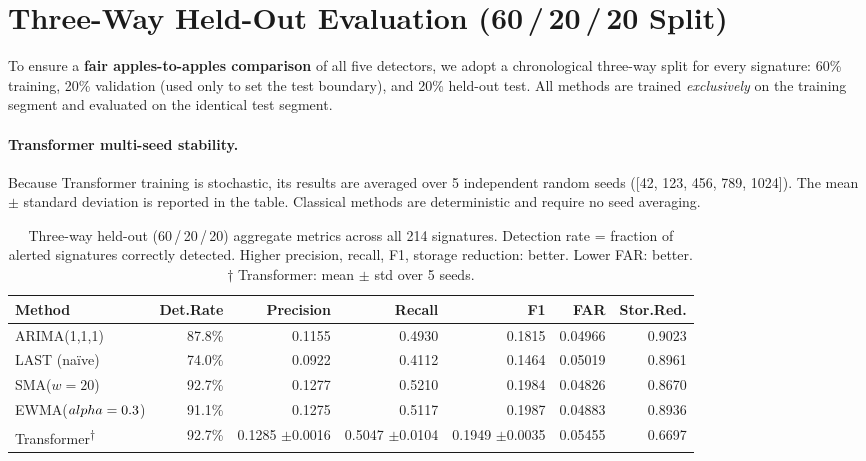 \documentclass[11pt,a4paper]{article}
\begin{document}
\section{Three-Way Held-Out Evaluation (60\,/\,20\,/\,20 Split)}

To ensure a \textbf{fair apples-to-apples comparison} of all five
detectors, we adopt a chronological three-way split for every signature:
60\% training, 20\% validation (used only to set the test boundary),
and 20\% held-out test.  All methods are trained \emph{exclusively} on the
training segment and evaluated on the identical test segment.

\paragraph{Transformer multi-seed stability.}
Because Transformer training is stochastic, its results are averaged over
5 independent random seeds ([42, 123, 456, 789, 1024]).
The mean $\pm$ standard deviation is reported in the table.
Classical methods are deterministic and require no seed averaging.

\begin{table}[H]
\centering
\caption{Three-way held-out (60\,/\,20\,/\,20) aggregate metrics across
  all 214 signatures.  Detection rate = fraction of alerted signatures
  correctly detected.  Higher precision, recall, F1, storage reduction:
  better.  Lower FAR: better.
  $\dagger$ Transformer: mean $\pm$ std over 5 seeds.}
\label{tab:threeway}
\begin{tabular}{lrrrrrr}
\toprule
Method & Det.Rate & Precision & Recall & F1 & FAR & Stor.Red. \\
\midrule
  ARIMA(1,1,1) & 87.8\% & 0.1155 & 0.4930 & 0.1815 & 0.04966 & 0.9023 \\
  LAST (na\"ive) & 74.0\% & 0.0922 & 0.4112 & 0.1464 & 0.05019 & 0.8961 \\
  SMA($w=20$) & 92.7\% & 0.1277 & 0.5210 & 0.1984 & 0.04826 & 0.8670 \\
  EWMA($\\alpha=0.3$) & 91.1\% & 0.1275 & 0.5117 & 0.1987 & 0.04883 & 0.8936 \\
  Transformer\textsuperscript{$\dagger$} & 92.7\% & 0.1285 {\small $\pm$0.0016} & 0.5047  {\small $\pm$0.0104} & 0.1949  {\small $\pm$0.0035} & 0.05455 & 0.6697 \\
\bottomrule
\end{tabular}
\end{table}
\end{document}
